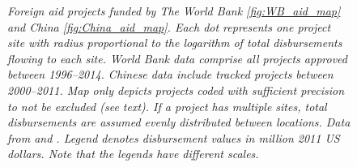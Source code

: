 \documentclass[11pt, oneside]{article}   	%
\newcommand{\mysubcaption}[1]{
\justify
\begin{spacing}{0.7}
\textit{\footnotesize #1}
\end{spacing}}
\begin{document}
\begin{figure}[!ph]
\label{fig:Aid_maps}
\mysubcaption{Foreign aid projects funded by The World Bank \eqref{fig:WB_aid_map} and China \eqref{fig:China_aid_map}. Each dot represents one project site with radius proportional to the logarithm of total disbursements flowing to each site. World Bank data comprise all projects approved between 1996--2014. Chinese data include tracked projects between 2000--2011. Map only depicts projects coded with sufficient precision to not be excluded (see text). If a project has multiple sites, total disbursements are assumed evenly distributed between locations. Data from \cite{AidData_WorldBankGeocoded_2017} and \cite{Strange_TrackingUnderreportedFinancial_2017}. Legend denotes disbursement values in million 2011 US dollars. Note that the legends have different scales.}
\end{figure}



\end{document}
